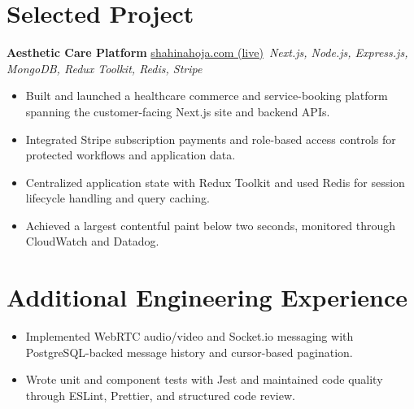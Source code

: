 \documentclass[11pt,a4paper,sans]{moderncv}
\begin{document}
\vspace{3pt}



\section{Selected Project}
\vspace{1pt}
\textbf{Aesthetic Care Platform} \hfill \href{https://shahinahoja.com/}{shahinahoja.com (live)}\
\textit{Next.js, Node.js, Express.js, MongoDB, Redux Toolkit, Redis, Stripe}
\begin{itemize}
\item {Built and launched a healthcare commerce and service-booking platform spanning the customer-facing Next.js site and backend APIs.}
\item {Integrated Stripe subscription payments and role-based access controls for protected workflows and application data.}
\item {Centralized application state with Redux Toolkit and used Redis for session lifecycle handling and query caching.}
\item {Achieved a largest contentful paint below two seconds, monitored through CloudWatch and Datadog.}
\end{itemize}


\section{Additional Engineering Experience}
\vspace{1pt}
\begin{itemize}
\item {Implemented WebRTC audio/video and Socket.io messaging with PostgreSQL-backed message history and cursor-based pagination.}
\item {Wrote unit and component tests with Jest and maintained code quality through ESLint, Prettier, and structured code review.}
\end{itemize}
\end{document}

